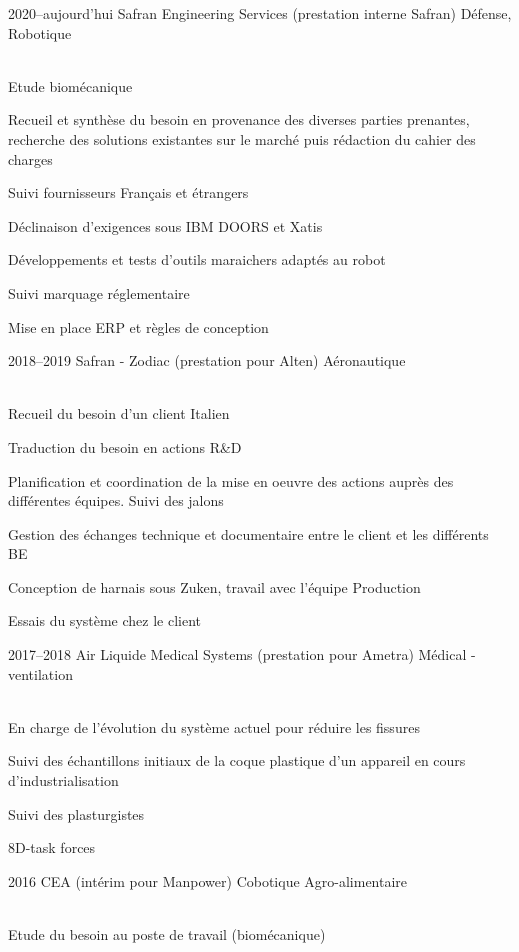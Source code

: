 \documentclass{cv-style}     %
\begin{document}
\begin{entrylist}
\entry
  {2020--aujourd'hui }
  {Safran Engineering Services (prestation interne Safran)}
  {Défense,  Robotique}
  {\\
  Etude biomécanique

  Recueil et synthèse du besoin en provenance des diverses parties prenantes, recherche des solutions existantes sur le marché puis rédaction du cahier des charges

  Suivi fournisseurs Français et étrangers

  Déclinaison d’exigences sous IBM DOORS et Xatis

  Développements et tests d'outils maraichers adaptés au robot

  Suivi marquage réglementaire

  Mise en place ERP et règles de conception

  }
\entry
  {2018--2019 }
  {Safran - Zodiac (prestation pour Alten)}
  {Aéronautique}
  {\\
  Recueil du besoin d'un client Italien

  Traduction du besoin en actions R\&D
  
  Planification et coordination de la mise en oeuvre des actions auprès des différentes équipes. Suivi des jalons

  Gestion des échanges technique et documentaire entre le client et les différents BE

  Conception de harnais sous Zuken, travail avec l'équipe Production

  Essais du système chez le client
 
  }
\entry
 {2017--2018 }
 {Air Liquide Medical Systems (prestation pour Ametra)}
 {Médical - ventilation}
 {\\
 En charge de l'évolution du système actuel pour réduire les fissures

 Suivi des échantillons initiaux de la coque plastique d'un appareil en cours d'industrialisation

 Suivi des plasturgistes

 8D-task forces

 }
\entry
 {2016 }
 {CEA (intérim pour Manpower)}
 {Cobotique Agro-alimentaire}
 {\\
 Etude du besoin au poste de travail (biomécanique)

}
\end{entrylist}
\end{document}

